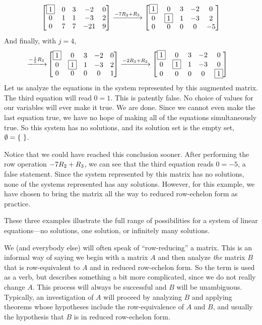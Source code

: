 \documentclass{ximera}
\begin{document}
\begin{example}
\begin{align*}
\begin{bmatrix}
\fbox{1} & 0 & 3 &  -2 & 0\\
0 & 1 & 1 & -3 & 2\\
0 & 7 &  7 & -21 &  9
\end{bmatrix}
\xrightarrow{-7R_{2}+R_{3}}
\begin{bmatrix}
\fbox{1} & 0 & 3 &  -2 & 0\\
0 & \fbox{1} & 1 & -3 & 2\\
0 & 0 &  0 & 0 &  -5
\end{bmatrix}
\end{align*}
And finally, with $j=4$,
\begin{align*}
\xrightarrow{-\frac{1}{5}R_{3}}
&
\begin{bmatrix}
\fbox{1} & 0 & 3 &  -2 & 0\\
0 & \fbox{1} & 1 & -3 & 2\\
0 & 0 &  0 & 0 &  1
\end{bmatrix}
\xrightarrow{-2R_{3}+R_{2}}
\begin{bmatrix}
\fbox{1} & 0 & 3 &  -2 & 0\\
0 & \fbox{1} & 1 & -3 & 0\\
0 & 0 &  0 & 0 &  \fbox{1}
\end{bmatrix}
\end{align*}
Let us analyze the equations in the system represented by this augmented matrix.  The third equation will read $0=1$.  This is patently false.  No choice of values for our variables will ever make it true.  We are done.  Since we cannot even make the last equation true, we have no hope of making all of the equations simultaneously true.  So this system has no solutions, and its solution set is the empty set, $\emptyset=\left\{\ \right\}$.

Notice that we could have reached this conclusion sooner.  After performing the row operation
$-7R_{2}+R_{3}$, we can see that the third equation reads $0=-5$, a false statement.  Since the system represented by this matrix has no solutions, none of the systems represented has any solutions.  However, for this example, we have chosen to bring the matrix all the way  to reduced row-echelon form as practice.
\end{example}

These three examples illustrate the full range of possibilities for a
system of linear equations---no solutions, one solution, or infinitely
many solutions.

We (and everybody else) will often speak of ``row-reducing'' a matrix.  This is an informal way of saying we begin with a matrix $A$ and then analyze \textit{the} matrix $B$ that is row-equivalent to $A$ and in reduced row-echelon form.  So the term  is used as a verb, but describes something a bit more complicated, since we do not really change $A$.   This process will always be successful and $B$ will be unambiguous.  Typically, an investigation of $A$ will proceed by analyzing $B$ and applying theorems whose hypotheses include the row-equivalence of $A$ and $B$, and usually the hypothesis that $B$ is in reduced row-echelon form.
\end{document}
